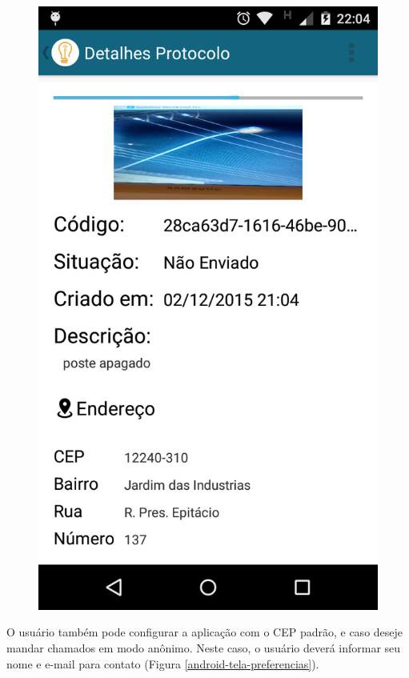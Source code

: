 \documentclass[
	article,			%
	11pt,				%
	oneside,			%
	a4paper,			%
	english,			%
	brazil,				%
	sumario=tradicional
	]{abntex2}
\begin{document}
\begin{figure}[!htbp]
\begin{minipage}{0.4\textwidth}
    \includegraphics[scale=0.1]{android/8.png}
  \end{minipage}
\end{figure}

O usuário também pode configurar a aplicação com o CEP padrão, e caso deseje mandar chamados em modo anônimo. Neste caso, o usuário deverá informar seu nome e e-mail para contato (Figura \ref{android-tela-preferencias}).
\end{document}
